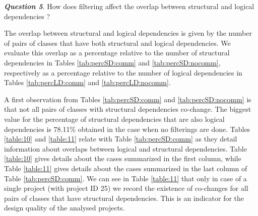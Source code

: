 \documentclass[a4paper,twoside]{article}
\begin{document}


\textit{\textbf{Question 5}}. How does filtering affect the overlap between structural and logical dependencies ? 

The overlap between structural and logical dependencies is given by the number of pairs of classes that have both structural and logical dependencies. We evaluate this overlap as a percentage relative to the number of structural dependencies in Tables \ref{tab:percSD:comm} and \ref{tab:percSD:nocomm}, respectively as  a percentage relative to the number of logical dependencies in Tables \ref{tab:percLD:comm} and \ref{tab:percLD:nocomm}.

A first observation from Tables \ref{tab:percSD:comm} and \ref{tab:percSD:nocomm} is that not all pairs of classes with structural dependencies co-change. The biggest value for the percentage of structural dependencies that are also logical dependencies is 78.11\% obtained in the case when no filterings are done.  Tables \ref{table:10} and \ref{table:11} relate with Table \ref{tab:percSD:comm} as they detail information about overlaps between logical and structural dependencies. Table \ref{table:10} gives details about the cases summarized in the first column, while Table \ref{table:11} gives details about the cases summarized in the last column of Table \ref{tab:percSD:comm}. 
We can see in Table \ref{table:11} that only in case of a single project (with project ID 25) we record the existence of co-changes for all pairs of classes that have structural dependencies. This is an indicator for the design quality of the analysed projects. 
\end{document}
